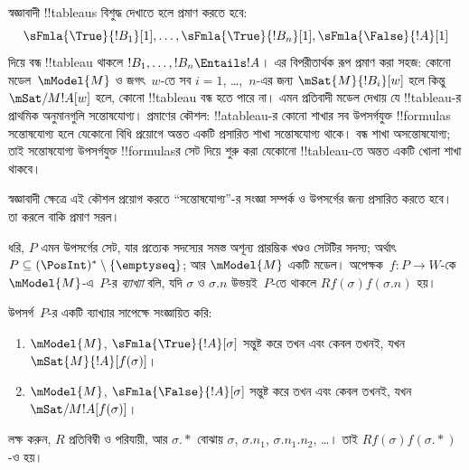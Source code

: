\documentclass[../../../include/open-logic-section]{subfiles}
\begin{document}


\begin{explain}
  স্বজ্ঞাবাদী !!{tableau}s বিশুদ্ধ দেখাতে হলে প্রমাণ করতে হবে:
  \[
  \sFmla{\True}{!B_1}[1], \dots, \sFmla{\True}{!B_n}[1], \sFmla{\False}{!A}[1]
  \]
  দিয়ে বন্ধ !!{tableau} থাকলে $!B_1, \dots, !B_n \Entails !A$।
  এর বিপরীতার্থক রূপ প্রমাণ করা সহজ: কোনো মডেল~$\mModel{M}$
  ও জগৎ~$w$-তে সব $i=1$, \dots,~$n$-এর জন্য
  $\mSat{M}{!B_i}[w]$ হলে কিন্তু
  $\mSat/{M}{!A}[w]$ হলে, কোনো !!{tableau} বন্ধ হতে পারে না।
  এমন প্রতিবাদী মডেল দেখায় যে !!{tableau}-র প্রাথমিক
  অনুমানগুলি সন্তোষযোগ্য। প্রমাণের কৌশল: !!a{tableau}-র
  কোনো শাখার সব উপসর্গযুক্ত !!{formula}s সন্তোষযোগ্য হলে
  যেকোনো বিধি প্রয়োগে অন্তত একটি প্রসারিত শাখা সন্তোষযোগ্য
  থাকে। বন্ধ শাখা অসন্তোষযোগ্য; তাই সন্তোষযোগ্য উপসর্গযুক্ত
  !!{formula}sর সেট দিয়ে শুরু করা যেকোনো !!{tableau}-তে
  অন্তত একটি খোলা শাখা থাকবে।

  স্বজ্ঞাবাদী ক্ষেত্রে এই কৌশল প্রয়োগ করতে
  ``সন্তোষযোগ্য''-র সংজ্ঞা সম্পর্ক ও উপসর্গের জন্য প্রসারিত
  করতে হবে। তা করলে বাকি প্রমাণ সরল।
\end{explain}

\begin{defn}
  ধরি, $P$ এমন উপসর্গের সেট, যার প্রত্যেক সদস্যের সমস্ত
  অশূন্য প্রারম্ভিক খণ্ডও সেটটির সদস্য; অর্থাৎ
  $P \subseteq (\PosInt)^* \setminus \{\emptyseq\}$;
  আর $\mModel{M}$ একটি মডেল। অপেক্ষক~$f\colon P \to W$-কে
  $\mModel{M}$-এ~$P$-র \emph{ব্যাখ্যা} বলি, যদি
  $\sigma$ ও $\sigma.n$ উভয়ই~$P$-তে থাকলে
  $Rf(\sigma)f(\sigma.n)$ হয়।

  উপসর্গ~$P$-র একটি ব্যাখ্যার সাপেক্ষে সংজ্ঞায়িত করি:
  \begin{enumerate}
  \item $\mModel{M}$, $\sFmla{\True}{!A}[\sigma]$
    সন্তুষ্ট করে তখন এবং কেবল তখনই, যখন $\mSat{M}{!A}[f(\sigma)]$।
  \item $\mModel{M}$, $\sFmla{\False}{!A}[\sigma]$
    সন্তুষ্ট করে তখন এবং কেবল তখনই, যখন $\mSat/{M}{!A}[f(\sigma)]$।
  \end{enumerate}
\end{defn}

লক্ষ করুন, $R$ প্রতিবিম্বী ও পরিযায়ী, আর $\sigma.{*}$
বোঝায় $\sigma$, $\sigma.n_1$, $\sigma.n_1.n_2$, \dots।
তাই $Rf(\sigma)f(\sigma.{*})$-ও হয়।
\end{document}
